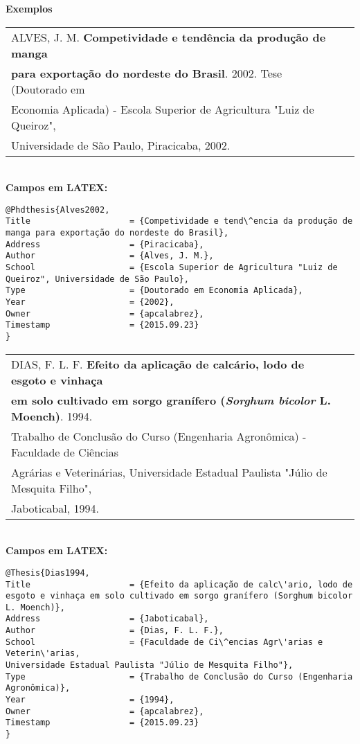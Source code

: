 \textbf{Exemplos}\\

\begin{tabular}{|l|c|} \hline
	ALVES, J. M. \textbf{Competividade e tend\^encia da produção de manga} \\ \textbf{para exportação do nordeste do Brasil}. 2002. Tese (Doutorado em \\ Economia Aplicada) - Escola Superior de Agricultura "Luiz de Queiroz", \\ Universidade de São Paulo, Piracicaba, 2002.    \\\hline
\end{tabular} \\

\textbf{Campos em LATEX:}

\begin{verbatim}
@Phdthesis{Alves2002,
Title                    = {Competividade e tend\^encia da produção de 
manga para exportação do nordeste do Brasil},
Address                  = {Piracicaba},
Author                   = {Alves, J. M.},
School                   = {Escola Superior de Agricultura "Luiz de 
Queiroz", Universidade de São Paulo},
Type                     = {Doutorado em Economia Aplicada},
Year                     = {2002},
Owner                    = {apcalabrez},
Timestamp                = {2015.09.23}
}
\end{verbatim} 

\begin{tabular}{|l|c|} \hline
	DIAS, F. L. F. \textbf{Efeito da aplicação de calc\'ario, lodo de esgoto e vinhaça} \\ \textbf{em solo cultivado em sorgo granífero (\textit{Sorghum bicolor} L. Moench)}. 1994. \\ Trabalho de Conclusão do Curso (Engenharia Agronômica) - Faculdade de Ci\^encias\\  Agr\'arias e Veterin\'arias, Universidade Estadual Paulista "Júlio de Mesquita Filho", \\ Jaboticabal, 1994.     \\\hline
\end{tabular} \\

\textbf{Campos em LATEX:} 

\begin{verbatim}
@Thesis{Dias1994,
Title                    = {Efeito da aplicação de calc\'ario, lodo de 
esgoto e vinhaça em solo cultivado em sorgo granífero (Sorghum bicolor 
L. Moench)},
Address                  = {Jaboticabal},
Author                   = {Dias, F. L. F.},
School                   = {Faculdade de Ci\^encias Agr\'arias e Veterin\'arias, 
Universidade Estadual Paulista "Júlio de Mesquita Filho"},
Type                     = {Trabalho de Conclusão do Curso (Engenharia 
Agronômica)},
Year                     = {1994},
Owner                    = {apcalabrez},
Timestamp                = {2015.09.23}
}
\end{verbatim}


